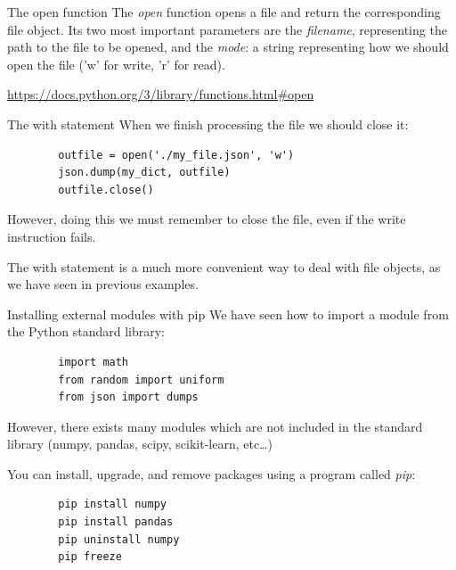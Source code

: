 \documentclass[aspectratio=169,]{beamer}
\begin{document}
\begin{frame}[fragile]{The open function}
    The \emph{open} function opens a file and return the corresponding file object.
    Its two most important parameters are the \emph{filename}, representing the path to the file to be opened, and the
    \emph{mode}: a string representing how we should open the file ('w' for write, 'r' for read).

    \url{https://docs.python.org/3/library/functions.html#open}
\end{frame}

\begin{frame}[fragile]{The with statement}
    When we finish processing the file we should close it:
    \begin{verbatim}
        outfile = open('./my_file.json', 'w')
        json.dump(my_dict, outfile)
        outfile.close()
    \end{verbatim}
    However, doing this we must remember to close the file, even if the write instruction fails.

    The with statement is a much more convenient way to deal with file objects, as we have seen in previous examples.
\end{frame}



\begin{frame}[fragile]{Installing external modules with pip}
    We have seen how to import a module from the Python standard library:
    \begin{verbatim}
        import math
        from random import uniform
        from json import dumps
    \end{verbatim}

    However, there exists many modules which are not included in the standard library (numpy, pandas, scipy,
    scikit-learn, etc\ldots)

    You can install, upgrade, and remove packages using a program called \emph{pip}:
    \begin{verbatim}
        pip install numpy
        pip install pandas
        pip uninstall numpy
        pip freeze
    \end{verbatim}
\end{frame}
\end{document}
